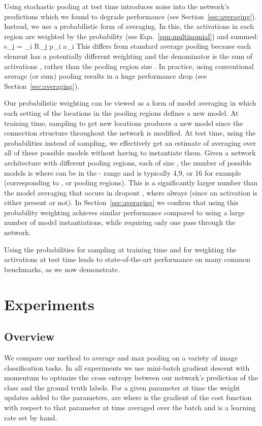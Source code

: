 \documentclass{article} \usepackage{nips12submit_e,times}
\def\BE{\vspace{-0.0mm}}
\newcommand{\eqn}[1]{Eqn.~\ref{eqn:#1}}
\newcommand{\secc}[1]{Section~\ref{sec:#1}}
\begin{document}
Using stochastic pooling at test time introduces noise into
the network's predictions which we found to degrade performance (see \secc{averaging}). Instead, we
use a probabilistic form of averaging. In this, the activations in
each region are weighted by the probability  (see
\eqn{multinomial}) and summed:
\BE
s_j = \sum_{i \in R_j} p_i a_i
\EE
This differs from standard average pooling because each element has a potentially different
weighting and the denominator is the
sum of activations , rather than the pooling
region size . In practice, using conventional average (or sum) pooling
results in a huge performance drop (see \secc{averaging}).




Our probabilistic weighting can be viewed as a form of model averaging
in which each setting of the locations  in the pooling regions
defines a new model. At training time, sampling to get new locations
produces a new model since the connection structure throughout the
network is modified. At test time, using the probabilities instead of
sampling, we effectively get an estimate of averaging over all of these possible
models without having to instantiate them.
Given a network architecture with  different pooling
regions, each of size , the number of possible models is  where  can be in
the - range and  is typically 4,9, or 16 for example
(corresponding to ,  or  pooling
regions). This is a significantly larger number than the model averaging
that occurs in dropout \cite{Hinton12}, where  always (since an activation is either present or
not).
In \secc{averaging} we confirm that using this
probability weighting achieves similar performance compared to using a large number of model
instantiations, while requiring only one pass through the network.

Using the probabilities for sampling at training time and for
weighting the activations at test time leads to state-of-the-art
performance on many common benchmarks, as we now demonstrate.

\section{Experiments}
\label{exp_sec}

\subsection{Overview}
We compare our method to average and max pooling on a
variety of image classification tasks. In all experiments we use
mini-batch gradient descent with momentum to optimize the cross
entropy between our network's prediction of the class and the ground
truth labels. For a given parameter  at time  the weight updates
added to the parameters,  are  where  is the gradient of the cost
function with respect to that parameter at time  averaged over the
batch and  is a learning rate set by hand.
\end{document}
